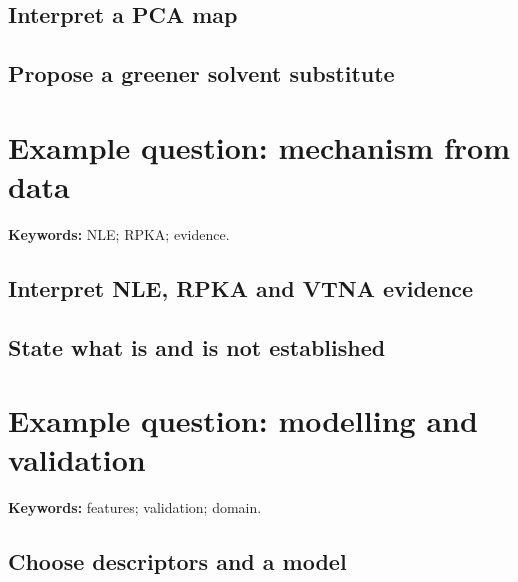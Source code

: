 
\subsection{Interpret a PCA map}


\subsection{Propose a greener solvent substitute}


\section{Example question: mechanism from data}

\begin{resultbox}
\textbf{Keywords:} NLE; RPKA; evidence.
\end{resultbox}

\subsection{Interpret NLE, RPKA and VTNA evidence}


\subsection{State what is and is not established}


\section{Example question: modelling and validation}

\begin{resultbox}
\textbf{Keywords:} features; validation; domain.
\end{resultbox}

\subsection{Choose descriptors and a model}

